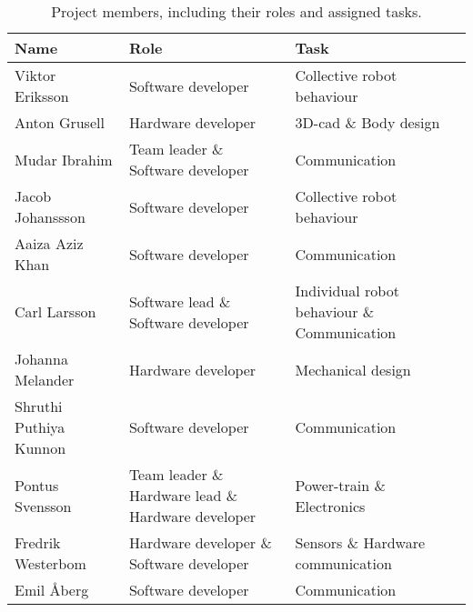 \begin{table}[H]
    \centering
    \caption{Project members, including their roles and assigned tasks.}
    \label{tab:contributors_roles}
    \begin{tabularx}{\columnwidth}{|X|X|X|} \hline
         \textbf{Name}          & \textbf{Role}                                         & \textbf{Task}                                 \\ \hline
         Viktor Eriksson        & Software developer                                    & Collective robot behaviour                    \\ \hline
         Anton Grusell          & Hardware developer                                    & 3D-\acs{cad} \& Body design                   \\ \hline
         Mudar Ibrahim          & Team leader \& Software developer                     & Communication                                 \\ \hline
         Jacob Johanssson       & Software developer                                    & Collective robot behaviour                    \\ \hline
         Aaiza Aziz Khan        & Software developer                                    & Communication                                 \\ \hline
         Carl Larsson           & Software lead \& Software developer                   & Individual robot behaviour \& Communication   \\ \hline
         Johanna Melander       & Hardware developer                                    & Mechanical design                             \\ \hline
         Shruthi Puthiya Kunnon & Software developer                                    & Communication                                 \\ \hline
         Pontus Svensson        & Team leader \& Hardware lead \& Hardware developer    & Power-train \& Electronics                    \\ \hline
         Fredrik Westerbom      & Hardware developer \& Software developer              & Sensors \& Hardware communication             \\ \hline
         Emil Åberg             & Software developer                                    & Communication                                 \\ \hline
    \end{tabularx}
\end{table}

